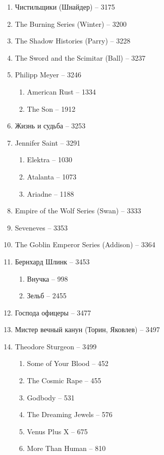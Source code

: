 \documentclass[a4paper, 11pt]{proc} %
\begin{document}
\begin{enumerate}
\begin{enumerate}
        \end{enumerate}
    \item Чистильщики (Шнайдер) -- 3175
    \item The Burning Series (Winter) -- 3200
    \item The Shadow Histories (Parry) -- 3228
    \item The Sword and the Scimitar (Ball) -- 3237
    \item Philipp Meyer -- 3246
        \begin{enumerate}
            \item American Rust -- 1334
            \item The Son -- 1912
        \end{enumerate}
    \item Жизнь и судьба -- 3253
    \item Jennifer Saint -- 3291
        \begin{enumerate}
            \item Elektra -- 1030
            \item Atalanta -- 1073
            \item Ariadne -- 1188
        \end{enumerate}
    \item Empire of the Wolf Series (Swan) -- 3333
    \item Seveneves -- 3353
    \item The Goblin Emperor Series (Addison) -- 3364
    \item Бернхард Шлинк -- 3453
        \begin{enumerate}
            \item Внучка -- 998
            \item Зельб -- 2455
        \end{enumerate}
    \item Господа офицеры -- 3477
    \item Мистер вечный канун (Торин, Яковлев) -- 3497
    \item Theodore Sturgeon -- 3499
        \begin{enumerate}
            \item Some of Your Blood -- 452
            \item The Cosmic Rape -- 455
            \item Godbody -- 531
            \item The Dreaming Jewels -- 576
            \item Venus Plus X -- 675
            \item More Than Human -- 810

\end{enumerate}
\end{enumerate}
\end{document}

